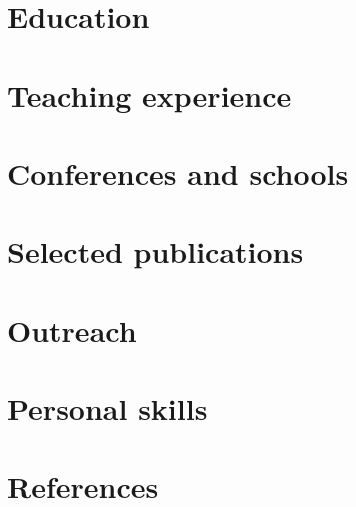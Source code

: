 \documentclass{cv}
\begin{document}
\thispagestyle{empty}					%
\pagestyle{fancy}			 		%

\vspace*{-0.50cm}
\centering 


\vspace*{0.25cm}
\section{Education}


\vspace*{0.25cm}
\section{Teaching experience}


\vspace*{0.25cm}
\section{Conferences and schools}


\vspace*{0.25cm}
\section{Selected publications}


\vspace*{0.25cm}
\section{Outreach}


\vspace*{0.25cm}
\section{Personal skills}


\vspace*{0.25cm}
\section{References}

\end{document}
